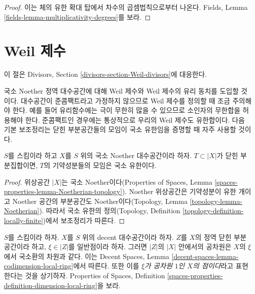 \begin{proof}
이는 체의 유한 확대 탑에서 차수의 곱셈법칙으로부터 나온다. Fields,
Lemma \ref{fields-lemma-multiplicativity-degrees}를 보라.
\end{proof}









\section{Weil 제수}
\label{section-Weil-divisors}

\noindent
이 절은 Divisors, Section \ref{divisors-section-Weil-divisors}에 대응한다.

\medskip\noindent
국소 Noether 정역 대수공간에 대해 Weil 제수와 Weil 제수의 유리 동치를
도입할 것이다. 대수공간이 준콤팩트라고 가정하지 않으므로 Weil 제수를
정의할 때 조금 주의해야 한다. 예를 들어 유리함수에는 극이 무한히 많을
수 있으므로 소인자의 무한합을 허용해야 한다. 준콤팩트인 경우에는
통상적으로 우리의 Weil 제수도 유한합이다. 다음 기본 보조정리는 닫힌
부분공간들의 모임이 국소 유한임을 증명할 때 자주 사용할 것이다.

\begin{lemma}
\label{lemma-components-locally-finite}
$S$를 스킴이라 하고 $X$를 $S$ 위의 국소 Noether 대수공간이라 하자.
$T \subset |X|$가 닫힌 부분집합이면, $T$의 기약성분들의 모임은
국소 유한이다.
\end{lemma}

\begin{proof}
위상공간 $|X|$는 국소 Noether이다(Properties of Spaces, Lemma
\ref{spaces-properties-lemma-Noetherian-topology}). Noether 위상공간은
기약성분이 유한 개이고 Noether 공간의 부분공간도 Noether이다(Topology,
Lemma \ref{topology-lemma-Noetherian}). 따라서 국소 유한의 정의(Topology,
Definition \ref{topology-definition-locally-finite})에서 보조정리가 따른다.
\end{proof}

\noindent
$S$를 스킴이라 하자. $X$를 $S$ 위의 decent 대수공간이라 하자.
$Z$를 $X$의 정역 닫힌 부분공간이라 하고, $\xi \in |Z|$를 일반점이라
하자. 그러면 $|Z|$의 $|X|$ 안에서의 공차원은 $X$의 $\xi$에서 국소환의
차원과 같다. 이는 Decent Spaces, Lemma
\ref{decent-spaces-lemma-codimension-local-ring}에서 따른다. 또한 이를
{\it $\xi$가 공차원 $1$인 $X$의 점이다}라고 표현한다는 것을
상기하자. Properties of Spaces, Definition
\ref{spaces-properties-definition-dimension-local-ring}을 보라.

